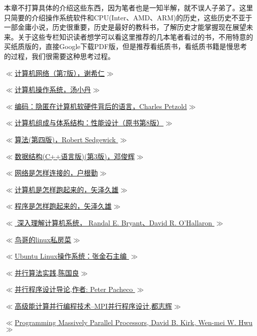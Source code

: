 \documentclass[utf8]{book}
\begin{document}
	本章不打算具体的介绍这些东西，因为笔者也是一知半解，就不误人子弟了。这里只简要的介绍操作系统软件和CPU(Inter、AMD、ARM)的历史，这些历史不亚于一部金庸小说，历史很重要，历史是最好的教科书，了解历史才能掌握现在展望未来。关于这些专栏知识读者想学可以看这里推荐的几本笔者看过的书，不用特意的买纸质版的，直接Google下载PDF版，但是推荐看纸质书，看纸质书籍是慢思考的过程，我们很需要这种思考过程。
	
	\href{https://book.douban.com/subject/26960678/}{$\ll$计算机网络（第7版），谢希仁$\gg$}
	
	\href{https://book.douban.com/subject/26079463/}{$\ll$计算机操作系统，汤小丹$\gg$}
	
	\href{https://book.douban.com/subject/4822685/}{$\ll$编码：隐匿在计算机软硬件背后的语言，Charles Petzold$\gg$}
	
	\href{https://book.douban.com/subject/6398113/}{$\ll$计算机组成与体系结构：性能设计（原书第8版）$\gg$}
	
	\href{https://book.douban.com/subject/19952400/}{$\ll$算法(第四版)，Robert Sedgewick $\gg$}
	
	\href{https://book.douban.com/subject/25859528/}{$\ll$数据结构(C++语言版)(第3版)，邓俊辉$\gg$}\
	
	\href{https://book.douban.com/subject/26941639/}{$\ll$网络是怎样连接的，户根勤$\gg$}
	
	\href{https://book.douban.com/subject/26397183/}{$\ll$计算机是怎样跑起来的，矢泽久雄$\gg$}
	
	\href{https://book.douban.com/subject/26365491/}{$\ll$程序是怎样跑起来的，矢泽久雄$\gg$}
	
	{\normalsize  \href{https://book.douban.com/subject/26912767/}{$\ll$ 深入理解计算机系统， Randal E. Bryant、David R. O’Hallaron $\gg$}}
	
	\href{https://book.douban.com/subject/4889838/}{$\ll$鸟哥的linux私房菜$\gg$}
	
	\href{https://book.douban.com/subject/30259532/}{$\ll$Ubuntu Linux操作系统：张金石主编 $\gg$}
	
	\href{https://book.douban.com/subject/1187182/}{$\ll$并行算法实践,陈国良$\gg$}
	
	\href{https://book.douban.com/subject/20374756/}{$\ll$并行程序设计导论,作者: Peter Pacheco $\gg$}
	
	\href{https://book.douban.com/subject/1244566/}{$\ll$高级能计算并行编程技术--MPI并行程序设计,都志辉$\gg$}
	
	\href{https://book.douban.com/subject/4265432/}{$\ll$Programming Massively Parallel Processors, David B. Kirk, Wen-mei W. Hwu $\gg$}
	
\end{document}
